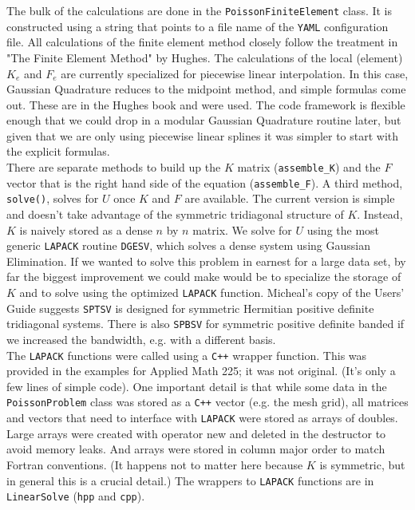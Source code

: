 The bulk of the calculations are done in the \texttt{PoissonFiniteElement} class.  It is constructed using a string that points to a file name of the \texttt{YAML} configuration file.  All calculations of the finite element method closely follow the treatment in "The Finite Element Method" by Hughes.  The calculations of the local (element)	 $K_{e}$ and $F_{e}$ are currently specialized for piecewise linear interpolation.  In this case, Gaussian Quadrature reduces to the midpoint method, and simple formulas come out.  These are in the Hughes book and were used.  The code framework is flexible enough that we could drop in a modular Gaussian Quadrature routine later, but given that we are only using piecewise linear splines it was simpler to start with the explicit formulas. \\

There are separate methods to build up the $K$ matrix (\texttt{assemble\_K}) and the $F$ vector that is the right hand side of the equation (\texttt{assemble\_F}).  A third method, \texttt{solve()}, solves for $U$ once $K$ and $F$ are available.  The current version is simple and doesn't take advantage of the symmetric tridiagonal structure of $K$.  Instead, $K$ is naively stored as a dense $n$ by $n$ matrix.  We solve for $U$ using the most generic \texttt{LAPACK} routine \texttt{DGESV}, which solves a dense system using Gaussian Elimination.  If we wanted to solve this problem in earnest for a large data set, by far the biggest improvement we could make would be to specialize the storage of $K$ and to solve using the optimized \texttt{LAPACK} function.  Micheal's copy of the Users' Guide suggests \texttt{SPTSV} is designed for symmetric Hermitian positive definite tridiagonal systems.  There is also \texttt{SPBSV} for symmetric positive definite banded if we increased the bandwidth, e.g. with a different basis. \\

The \texttt{LAPACK} functions were called using a \texttt{C++} wrapper function.  This was provided in the examples for Applied Math 225; it was not original.  (It's only a few lines of simple code).  One important detail is that while some data in the \texttt{PoissonProblem} class was stored as a \texttt{C++} vector (e.g. the mesh grid), all matrices and vectors that need to interface with \texttt{LAPACK} were stored as arrays of doubles.  Large arrays were created with operator new and deleted in the destructor to avoid memory leaks.  And arrays were stored in column major order to match Fortran conventions.  (It happens not to matter here because $K$ is symmetric, but in general this is a crucial detail.)  The wrappers to \texttt{LAPACK} functions are in \texttt{LinearSolve} (\texttt{hpp} and \texttt{cpp}). \\


